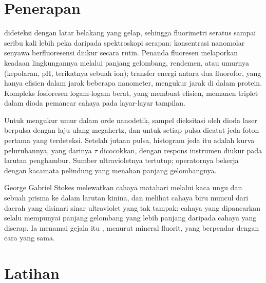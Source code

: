 \section{Penerapan}

 dideteksi dengan latar belakang yang gelap, sehingga fluorimetri
seratus sampai seribu kali lebih peka daripada spektroskopi serapan:
konsentrasi nanomolar senyawa berfluoresensi diukur secara rutin. Penanda
fluoresen melaporkan keadaan lingkungannya melalui panjang gelombang,
rendemen, atau umurnya (kepolaran, pH, terikatnya sebuah ion); transfer
energi antara dua fluorofor, yang hanya efisien dalam jarak beberapa
nanometer, mengukur jarak di dalam protein. Kompleks fosforesen logam-logam
berat, yang  membuat  efisien,
memanen triplet dalam dioda pemancar cahaya pada layar-layar tampilan.

\begin{inthelab}
Untuk mengukur umur dalam orde nanodetik, sampel dieksitasi oleh dioda laser
berpulsa dengan laju ulang megahertz, dan untuk setiap pulsa dicatat jeda
foton  pertama yang terdeteksi. Setelah jutaan pulsa, histogram
jeda itu adalah kurva peluruhannya, yang darinya $\tau$ dicocokkan, dengan
respons instrumen diukur pada larutan penghambur. Sumber ultravioletnya
tertutup; operatornya bekerja dengan kacamata pelindung yang menahan panjang
gelombangnya.
\end{inthelab}

\begin{history}[Stokes, 1852]
George Gabriel Stokes melewatkan cahaya matahari melalui kaca ungu dan sebuah
prisma ke dalam larutan kinina, dan melihat cahaya biru muncul dari daerah yang
disinari sinar ultraviolet yang tak tampak: cahaya yang dipancarkan selalu
mempunyai panjang gelombang yang lebih panjang daripada cahaya yang diserap.
Ia menamai gejala itu , menurut mineral fluorit, yang berpendar
dengan cara yang sama.
\end{history}

\section{Latihan}


